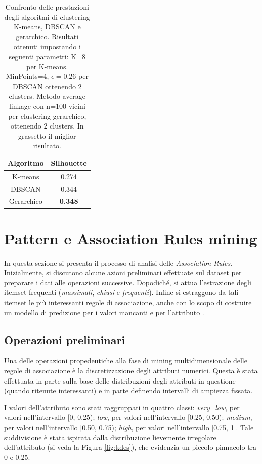 \documentclass[a4paper]{article}
\let\texttt\path
\begin{document}
\begin{table}
\setlength{\tabcolsep}{5pt} %
\renewcommand{\arraystretch}{1} %
\caption{Confronto delle prestazioni degli algoritmi di clustering K-means, DBSCAN e gerarchico. Risultati ottenuti impostando i seguenti parametri: K=8 per K-means. MinPoints=4, $\epsilon=0.26$ per DBSCAN ottenendo 2 clusters. Metodo average linkage con n=100 vicini per clustering gerarchico, ottenendo 2 clusters. In grassetto il miglior risultato.}

\begin{tabular}{c|c}
Algoritmo & Silhouette \\
\hline 
K-means & 0.274 \\ 
DBSCAN & 0.344 \\ 
Gerarchico & \textbf{0.348} \\ 
\hline 
\end{tabular} 
\label{tab:performance_clustering}
\end{table}

\section{Pattern e Association Rules mining}

In questa sezione si presenta il processo di analisi delle \textit{Association Rules}. Inizialmente, si discutono alcune azioni preliminari effettuate sul dataset per preparare i dati alle operazioni successive. 
Dopodiché, si attua l'estrazione degli itemset frequenti (\textit{massimali}, \textit{chiusi} e \textit{frequenti}). 
Infine si estraggono da tali itemset le più interessanti regole di associazione, anche con lo scopo di costruire un modello di predizione per i valori mancanti e per l'attributo \texttt{left}.

\subsection{Operazioni preliminari}

Una delle operazioni propedeutiche alla fase di mining multidimensionale delle regole di associazione è la discretizzazione degli attributi numerici. Questa è stata effettuata in parte sulla base delle distribuzioni degli attributi in questione (quando ritenute interessanti) e in parte definendo intervalli di ampiezza fissata.

I valori dell'attributo \texttt{satisfaction_level} sono stati raggruppati in quattro classi: \textit{very\_low}, per valori nell'intervallo [0, 0.25); \textit{low}, per valori nell'intervallo [0.25, 0.50); \textit{medium}, per valori nell'intervallo [0.50, 0.75); \textit{high}, per valori nell'intervallo [0.75, 1]. Tale suddivisione è stata ispirata dalla distribuzione lievemente irregolare dell'attributo (si veda la Figura \ref{fig:kdes}), che evidenzia un piccolo pinnacolo tra 0 e 0.25.
\end{document}
